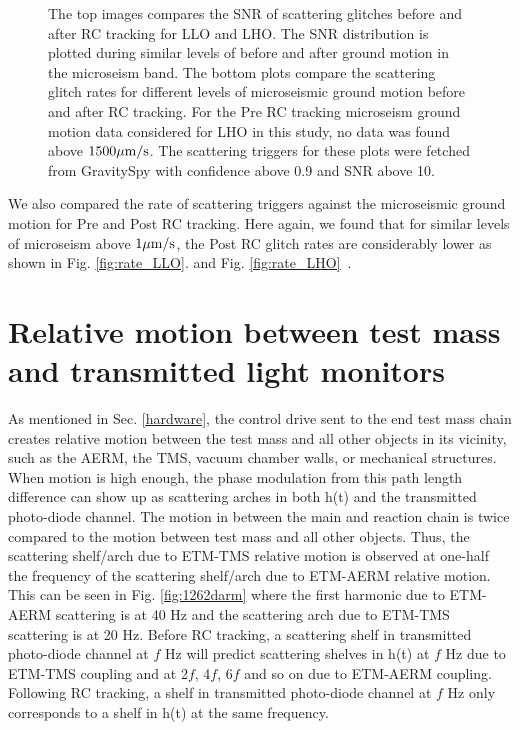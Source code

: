 \documentclass[12pt]{iopart}
\begin{document}
\begin{figure}[h]
    
    
    \caption{The top images compares the SNR of scattering glitches before and after RC tracking for LLO and LHO. The  SNR distribution is plotted during similar levels of before and after ground motion in the microseism band. The bottom plots compare the scattering glitch rates for different levels of microseismic ground motion before and after RC tracking. For the Pre RC tracking microseism ground motion data considered for LHO in this study, no data was found above $1500\mu{\rm m/s}$. The scattering triggers for these plots were fetched from GravitySpy with confidence above 0.9 and SNR above 10.} 
    \label{fig:postr0_scat}
    
\end{figure}
We also compared the rate of scattering triggers against the microseismic ground motion for Pre and Post RC tracking. Here again, we found that for similar levels of microseism above $1\mu{\rm m/s}$, the Post RC glitch rates are considerably lower as shown in Fig. \ref{fig:rate_LLO}. and Fig. \ref{fig:rate_LHO}~\cite{alog_corey}.


\section{Relative motion between test mass and transmitted light monitors} \label{transmon_scattering}
As mentioned in Sec. \ref{hardware}, the control drive sent to the end test mass chain creates relative motion between the test mass and all other objects in its vicinity, such as the AERM, the TMS, vacuum chamber walls, or mechanical structures. When motion is high enough, the phase modulation from this path length difference can show up as scattering arches in both h(t) and the transmitted photo-diode channel. The motion in between the main and reaction chain is twice compared to the motion between test mass and all other objects. Thus, the scattering shelf/arch due to ETM-TMS relative motion is observed at one-half the frequency of the scattering shelf/arch due to ETM-AERM relative motion. This can be seen in Fig. \ref{fig:1262darm} where the first harmonic due to ETM-AERM scattering is at 40 Hz and the scattering arch due to ETM-TMS scattering is at 20 Hz. Before RC tracking, a scattering shelf in transmitted photo-diode channel at $f$ Hz will predict scattering shelves in h(t) at $f$ Hz due to ETM-TMS coupling and at 2$f$, 4$f$, 6$f$ and so on due to ETM-AERM coupling. Following RC tracking, a shelf in transmitted photo-diode channel at $f$ Hz only corresponds to a shelf in h(t) at the same frequency.
\par
 
\end{document}

